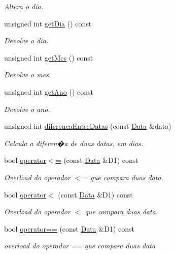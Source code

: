 \begin{DoxyCompactItemize}
\begin{DoxyCompactList}\small\item\em Altera o dia. \end{DoxyCompactList}\item 
unsigned int \mbox{\hyperlink{class_data_a459536c9351759b5697ba25456d9bd70}{get\+Dia}} () const
\begin{DoxyCompactList}\small\item\em Devolve o dia. \end{DoxyCompactList}\item 
unsigned int \mbox{\hyperlink{class_data_ab991d6a069c799930899b39bef9a4662}{get\+Mes}} () const
\begin{DoxyCompactList}\small\item\em Devolve o mes. \end{DoxyCompactList}\item 
unsigned int \mbox{\hyperlink{class_data_ae19e0d5af87f94f2809ba52dae69e15b}{get\+Ano}} () const
\begin{DoxyCompactList}\small\item\em Devolve o ano. \end{DoxyCompactList}\item 
unsigned int \mbox{\hyperlink{class_data_a495d15dd0d90b595740f6e09fd0a2177}{diferenca\+Entre\+Datas}} (const \mbox{\hyperlink{class_data}{Data}} \&data)
\begin{DoxyCompactList}\small\item\em Calcula a diferen�a de duas datas, em dias. \end{DoxyCompactList}\item 
bool \mbox{\hyperlink{class_data_a8c3fdab05b3e81bb7b302b1d4d9a9d1f}{operator$<$=}} (const \mbox{\hyperlink{class_data}{Data}} \&D1) const
\begin{DoxyCompactList}\small\item\em Overload do operador $<$= que compara duas data. \end{DoxyCompactList}\item 
bool \mbox{\hyperlink{class_data_a28b51c511a389cf30b9d1d2da858f3f6}{operator$<$}} (const \mbox{\hyperlink{class_data}{Data}} \&D1) const
\begin{DoxyCompactList}\small\item\em Overload do operador $<$ que compara duas data. \end{DoxyCompactList}\item 
bool \mbox{\hyperlink{class_data_af00bf4efbd3504689f6bc7283378ba5f}{operator==}} (const \mbox{\hyperlink{class_data}{Data}} \&D1) const
\begin{DoxyCompactList}\small\item\em overload do operador == que compara duas data \end{DoxyCompactList}\end{DoxyCompactItemize}
